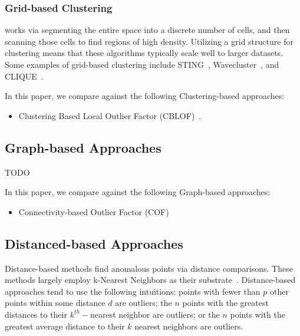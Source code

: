 \subsubsection{Grid-based Clustering}
\label{subsubsec:introduction:clustering-based-approaches:grid-based-clustering}
works via segmenting the entire space into a discrete number of cells, and then scanning those cells to find regions of high density.
Utilizing a grid structure for clustering means that these algorithms typically scale well to larger datasets.
Some examples of grid-based clustering include
STING~\cite{wang1997sting},
Wavecluster~\cite{sheikholeslami2000wavecluster}, and
CLIQUE~\cite{agrawal1998automatic}.

In this paper, we compare against the following Clustering-based approaches:
\begin{itemize}
    \item Clustering Based Local Outlier Factor (CBLOF)~\cite{he2003cblof}.
\end{itemize} 


\subsection{Graph-based Approaches}
\label{subsec:introduction:graph-based-approaches}

TODO

In this paper, we compare against the following Graph-based approaches:
\begin{itemize}
    \item Connectivity-based Outlier Factor (COF)~\cite{tang2002cof}
\end{itemize}


\subsection{Distanced-based Approaches}
\label{subsec:related-works:distanced-based-approaches}

Distance-based methods find anomalous points via distance comparisons.
These methods largely employ k-Nearest Neighbors as their substrate~\cite{wang2019progress}.
Distance-based approaches tend to use the following intuitions:
points with fewer than $p$ other points within some distance $d$ are outliers;
the $n$ points with the greatest distances to their $k^{th}-$nearest neighbor are outliers;
or the $n$ points with the greatest average distance to their $k$ nearest neighbors are outliers.

